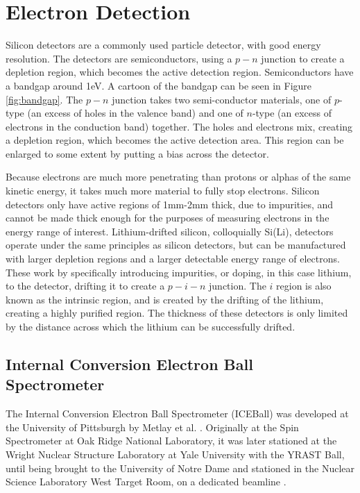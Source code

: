 

\section{Electron Detection}

Silicon detectors are a commonly used particle detector, with good energy resolution. The detectors are semiconductors, using a $p-n$ junction to create a depletion region, which becomes the active detection region\citep{knoll00:rad_det_meas}. Semiconductors have a bandgap around 1eV. A cartoon of the bandgap can be seen in Figure \ref{fig:bandgap}. The $p-n$ junction takes two semi-conductor materials, one of $p$-type (an excess of holes in the valence band) and one of $n$-type (an excess of electrons in the conduction band) together. The holes and electrons mix, creating a depletion region, which becomes the active detection area. This region can be enlarged to some extent by putting a bias across the detector.



Because electrons are much more penetrating than protons or alphas of the same kinetic energy, it takes much more material to fully stop electrons. Silicon detectors only have active regions of 1mm-2mm thick, due to impurities, and cannot be made thick enough for the purposes of measuring electrons in the energy range of interest. Lithium-drifted silicon, colloquially Si(Li), detectors operate under the same principles as silicon detectors, but can be manufactured with larger depletion regions and a larger detectable energy range of electrons. These work by specifically introducing impurities, or doping, in this case lithium, to the detector, drifting it to create a $p-i-n$ junction. The $i$ region is also known as the intrinsic region, and is created by the drifting of the lithium, creating a highly purified region. The thickness of these detectors is only limited by the distance across which the lithium can be successfully drifted.

\subsection{Internal Conversion Electron Ball Spectrometer}
\label{sec:iceball}

The Internal Conversion Electron Ball Spectrometer (ICEBall) was developed at the University of Pittsburgh by Metlay et al. \citep{metlay92:_iceball_comm,metlay93:_iceball_comm}. Originally at the Spin Spectrometer at Oak Ridge National Laboratory, it was later stationed at the Wright Nuclear Structure Laboratory at Yale University with the YRAST Ball, until being brought to the University of Notre Dame and stationed in the Nuclear Science Laboratory West Target Room, on a dedicated beamline \citep{battaglia15:_iceball_176lu}.

